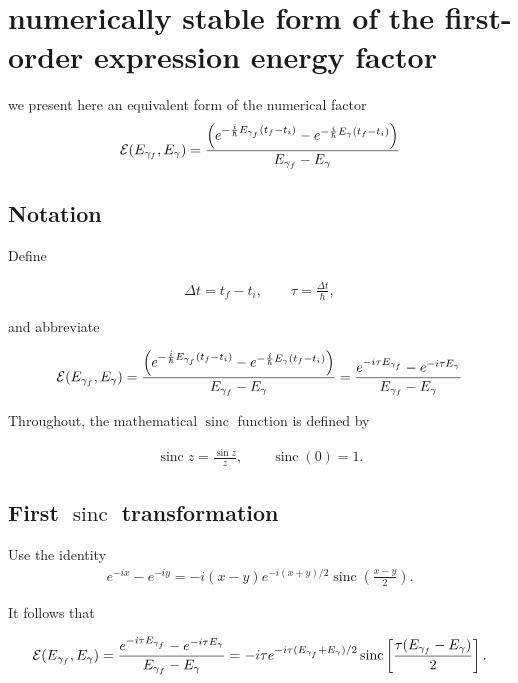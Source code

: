 \newpage

\section{ numerically stable form of the first-order expression energy factor}\label{sect-numerical-stable-first-order}

we present here an equivalent form of the numerical factor
\begin{align}
  {\cal E}(E_{\gamma_f},E_\gamma) = \frac{\left(e^{-\frac{i}{\hbar}E_{\gamma_f}(t_f-t_i)}-e^{-\frac{i}{\hbar}{ E_\gamma}(t_f-t_i)} \right)}{{E_{\gamma_f}- E_\gamma}}
\end{align}

\subsection{ Notation}

Define

\begin{align}\Delta t=t_f-t_i, \qquad
  \tau=\frac{\Delta t}{\hbar},
\end{align}

and abbreviate

\begin{align}
  {\cal E}(E_{\gamma_f},E_\gamma) = \frac{\left(e^{-\frac{i}{\hbar}E_{\gamma_f}(t_f-t_i)}-e^{-\frac{i}{\hbar}{ E_\gamma}(t_f-t_i)} \right)}{{E_{\gamma_f}- E_\gamma}}=
  \frac{e^{-i\tau E_{\gamma_f}}-e^{-i\tau E_{\gamma}}}{E_{\gamma_f}-E_\gamma}
\end{align}

Throughout, the mathematical $\operatorname{sinc}$ function is defined by

\begin{align}\operatorname{sinc}z=\frac{\sin z}{z}, \qquad
  \operatorname{sinc}(0)=1.
\end{align}

\subsection{ First $\operatorname{sinc}$ transformation}

Use the identity
\begin{align} e^{-ix}-e^{-iy} = -i(x-y)e^{-i(x+y)/2}\operatorname{sinc}\left(\frac{x-y}{2}\right).
\end{align}

It follows that
\begin{importantbox}
  \begin{align} {\cal E}(E_{\gamma_f},E_\gamma)=\frac{e^{-i\tau E_{\gamma_f}}-e^{-i\tau E_\gamma}}{E_{\gamma_f}-E_\gamma} = -i\tau
    e^{-i\tau(E_{\gamma_f}+E_\gamma)/2}        \operatorname{sinc} \left[
      \frac{\tau(E_{\gamma_f}-E_{\gamma})}{2}
    \right].
  \end{align}
\end{importantbox}
